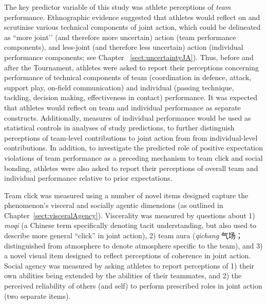\begin{CJK}{UTF8}{gbsn}
The key predictor variable of this study was athlete perceptions of \textit{team} performance.  Ethnographic evidence suggested that athletes would reflect on and scrutinise various technical components of joint action, which could be delineated as ``more joint’’ (and therefore more uncertain) action (team performance components), and less-joint (and therefore less uncertain) action (individual performance components; see Chapter ~\ref{sect:uncertaintyJA}).  Thus, before and after the Tournament, athletes were asked to report their perceptions concerning performance of technical components of team (coordination in defence, attack, support play, on-field communication) and individual (passing technique, tackling, decision making, effectiveness in contact) performance.  It was expected that athletes would reflect on team and individual performance as separate constructs.  Additionally, measures of individual performance would be used as statistical controls in analyses of study predictions, to further distinguish perceptions of team-level contributions to joint action from from individual-level contributions.  In addition, to investigate the predicted role of positive expectation violations of team performance as a preceding mechanism to team click and social bonding, athletes were also asked to report their perceptions of overall team and individual performance relative to prior expectations.

Team click was measured using a number of novel items designed capture the phenomenon's visceral and socially agentic dimensions (as outlined in Chapter~\ref{sect:visceralAgency}).  Viscerality was measured by questions about 1) \textit{moqi} (a Chinese term specifically denoting tacit understanding, but also used to describe more general ``click'' in joint action), 2) team aura (\textit{qichang} 气场；distinguished from atmosphere to denote atmosphere specific to the team), and 3) a novel visual item designed to reflect perceptions of coherence in joint action.  Social agency was measured by asking athletes to report perceptions of 1) their own abilities being extended by the abilities of their teammates, and 2) the perceived reliability of others (and self) to perform prescribed roles in joint action (two separate items).


\end{CJK}
